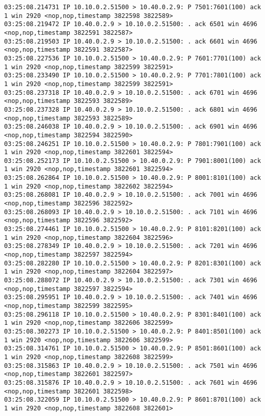 \documentclass[a4paper,12pt]{article}
\begin{document}
\begin{lstlisting}
03:25:08.214731 IP 10.10.0.2.51500 > 10.40.0.2.9: P 7501:7601(100) ack 1 win 2920 <nop,nop,timestamp 3822598 3822589>
03:25:08.219472 IP 10.40.0.2.9 > 10.10.0.2.51500: . ack 6501 win 4696 <nop,nop,timestamp 3822591 3822587>
03:25:08.219503 IP 10.40.0.2.9 > 10.10.0.2.51500: . ack 6601 win 4696 <nop,nop,timestamp 3822591 3822587>
03:25:08.227536 IP 10.10.0.2.51500 > 10.40.0.2.9: P 7601:7701(100) ack 1 win 2920 <nop,nop,timestamp 3822599 3822591>
03:25:08.233490 IP 10.10.0.2.51500 > 10.40.0.2.9: P 7701:7801(100) ack 1 win 2920 <nop,nop,timestamp 3822599 3822591>
03:25:08.237318 IP 10.40.0.2.9 > 10.10.0.2.51500: . ack 6701 win 4696 <nop,nop,timestamp 3822593 3822589>
03:25:08.237328 IP 10.40.0.2.9 > 10.10.0.2.51500: . ack 6801 win 4696 <nop,nop,timestamp 3822593 3822589>
03:25:08.246038 IP 10.40.0.2.9 > 10.10.0.2.51500: . ack 6901 win 4696 <nop,nop,timestamp 3822594 3822590>
03:25:08.246251 IP 10.10.0.2.51500 > 10.40.0.2.9: P 7801:7901(100) ack 1 win 2920 <nop,nop,timestamp 3822601 3822594>
03:25:08.252173 IP 10.10.0.2.51500 > 10.40.0.2.9: P 7901:8001(100) ack 1 win 2920 <nop,nop,timestamp 3822601 3822594>
03:25:08.262864 IP 10.10.0.2.51500 > 10.40.0.2.9: P 8001:8101(100) ack 1 win 2920 <nop,nop,timestamp 3822602 3822594>
03:25:08.268081 IP 10.40.0.2.9 > 10.10.0.2.51500: . ack 7001 win 4696 <nop,nop,timestamp 3822596 3822592>
03:25:08.268093 IP 10.40.0.2.9 > 10.10.0.2.51500: . ack 7101 win 4696 <nop,nop,timestamp 3822596 3822592>
03:25:08.274461 IP 10.10.0.2.51500 > 10.40.0.2.9: P 8101:8201(100) ack 1 win 2920 <nop,nop,timestamp 3822604 3822596>
03:25:08.278349 IP 10.40.0.2.9 > 10.10.0.2.51500: . ack 7201 win 4696 <nop,nop,timestamp 3822597 3822594>
03:25:08.282280 IP 10.10.0.2.51500 > 10.40.0.2.9: P 8201:8301(100) ack 1 win 2920 <nop,nop,timestamp 3822604 3822597>
03:25:08.288072 IP 10.40.0.2.9 > 10.10.0.2.51500: . ack 7301 win 4696 <nop,nop,timestamp 3822597 3822594>
03:25:08.295951 IP 10.40.0.2.9 > 10.10.0.2.51500: . ack 7401 win 4696 <nop,nop,timestamp 3822599 3822595>
03:25:08.296118 IP 10.10.0.2.51500 > 10.40.0.2.9: P 8301:8401(100) ack 1 win 2920 <nop,nop,timestamp 3822606 3822599>
03:25:08.302273 IP 10.10.0.2.51500 > 10.40.0.2.9: P 8401:8501(100) ack 1 win 2920 <nop,nop,timestamp 3822606 3822599>
03:25:08.314761 IP 10.10.0.2.51500 > 10.40.0.2.9: P 8501:8601(100) ack 1 win 2920 <nop,nop,timestamp 3822608 3822599>
03:25:08.315863 IP 10.40.0.2.9 > 10.10.0.2.51500: . ack 7501 win 4696 <nop,nop,timestamp 3822601 3822597>
03:25:08.315876 IP 10.40.0.2.9 > 10.10.0.2.51500: . ack 7601 win 4696 <nop,nop,timestamp 3822601 3822598>
03:25:08.322059 IP 10.10.0.2.51500 > 10.40.0.2.9: P 8601:8701(100) ack 1 win 2920 <nop,nop,timestamp 3822608 3822601>

\end{lstlisting}
\end{document}

